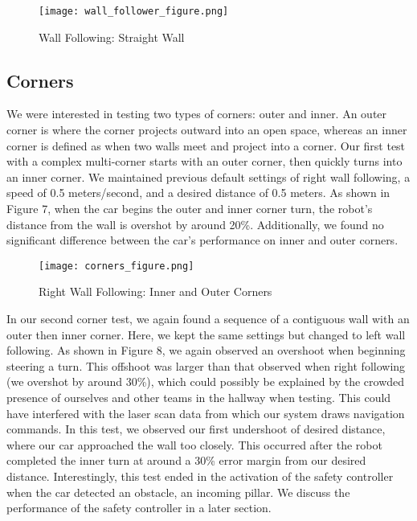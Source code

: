 \documentclass{article}
\begin{document}
\begin{figure}[H]
\begin{center}
\texttt{[image: wall\_follower\_figure.png]} %
\caption{Wall Following: Straight Wall}
\end{center}
\label{workflow}
\end{figure}

\subsection{Corners}
We were interested in testing two types of corners: outer and inner. An outer corner is where the corner projects outward into an open space, whereas an inner corner is defined as when two walls meet and project into a corner. Our first test with a complex multi-corner starts with an outer corner, then quickly turns into an inner corner. We maintained previous default settings of right wall following, a speed of 0.5 meters/second, and a desired distance of 0.5 meters. As shown in Figure 7, when the car begins the outer and inner corner turn, the robot's distance from the wall is overshot by around 20\%. Additionally, we found no significant difference between the car's performance on inner and outer corners.

\begin{figure}[H]
\begin{center}
\texttt{[image: corners\_figure.png]} %
\caption{Right Wall Following: Inner and Outer Corners}
\end{center}
\label{plot}
\end{figure}

In our second corner test, we again found a sequence of a contiguous wall with an outer then inner corner. Here, we kept the same settings but changed to left wall following. As shown in Figure 8, we again observed an overshoot when beginning steering a turn. This offshoot was larger than that observed when right following (we overshot by around 30\%), which could possibly be explained by the crowded presence of ourselves and other teams in the hallway when testing. This could have interfered with the laser scan data from which our system draws navigation commands. In this test, we observed our first undershoot of desired distance, where our car approached the wall too closely. This occurred after the robot completed the inner turn at around a 30\% error margin from our desired distance. Interestingly, this test ended in the activation of the safety controller when the car detected an obstacle, an incoming pillar. We discuss the performance of the safety controller in a later section.\\
\end{document}
